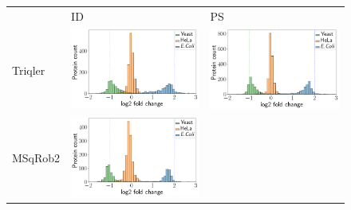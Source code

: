 \documentclass[11pt]{article}
\begin{document}
\begin{figure}[hbt]
    \begin{tabular}{>{\centering\arraybackslash} m{3cm} V V} 
        & ID & PS \\
        Triqler & \includegraphics[width=\linewidth]{../../result/report_plots_pipeline/histogram_ID_triqler.png} & 
        \includegraphics[width=\linewidth]{../../result/report_plots_pipeline/histogram_PS_triqler.png} \\ 
        MSqRob2 & \vspace{-1cm}\includegraphics[trim={0 0 0 6}, clip, width=\linewidth]{../../result/report_plots_pipeline/histogram_ID_msqrob2.png} & 

\end{tabular}
\end{figure}
\end{document}
